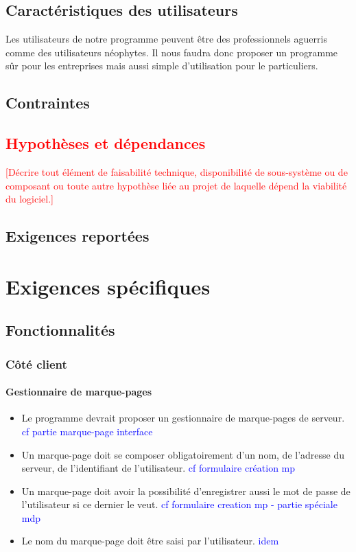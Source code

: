 \documentclass[10pt,a4paper]{report}
\begin{document}
\subsection{Caractéristiques des utilisateurs}
Les utilisateurs de notre programme peuvent être des professionnels aguerris comme des utilisateurs néophytes. Il nous faudra donc proposer un programme sûr pour les entreprises mais aussi simple d'utilisation pour le particuliers.

\subsection{Contraintes}

\textcolor{red}{\subsection{Hypothèses et dépendances}
[Décrire tout élément de faisabilité technique, disponibilité de sous-système ou de composant ou toute autre hypothèse liée au projet de laquelle dépend la viabilité du logiciel.]}

\subsection{Exigences reportées}

\section{Exigences spécifiques}

\subsection{Fonctionnalités}

\subsubsection{Côté client}
\paragraph{Gestionnaire de marque-pages}
	\begin{itemize}
		\item Le programme devrait proposer un gestionnaire de marque-pages de serveur. \textcolor{blue}{cf partie marque-page interface}
		\item Un marque-page doit se composer obligatoirement d'un nom, de l'adresse du serveur, de l'identifiant de l'utilisateur. \textcolor{blue}{cf formulaire création mp}
		\item Un marque-page doit avoir la possibilité d'enregistrer aussi le mot de passe de l'utilisateur si ce dernier le veut. \textcolor{blue}{cf formulaire creation mp - partie spéciale mdp}
		\item Le nom du marque-page doit être saisi par l'utilisateur. \textcolor{blue}{idem}
	\end{itemize}
	
\end{document}
